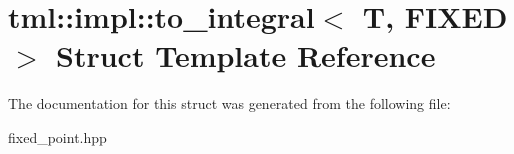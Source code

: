\hypertarget{structtml_1_1impl_1_1to__integral}{\section{tml\+:\+:impl\+:\+:to\+\_\+integral$<$ T, F\+I\+X\+E\+D $>$ Struct Template Reference}
\label{structtml_1_1impl_1_1to__integral}
}


The documentation for this struct was generated from the following file\+:\begin{DoxyCompactItemize}
\item 
fixed\+\_\+point.\+hpp\end{DoxyCompactItemize}
